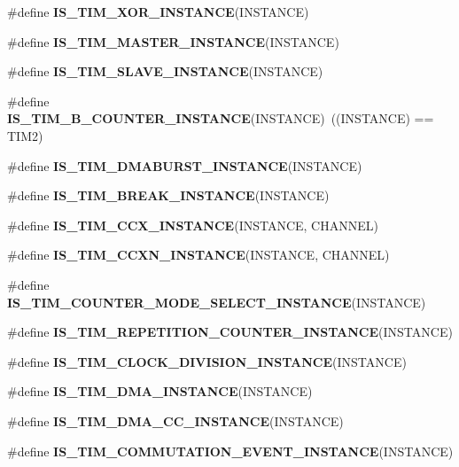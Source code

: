\begin{DoxyCompactItemize}
\item 
\#define {\bfseries I\+S\+\_\+\+T\+I\+M\+\_\+\+X\+O\+R\+\_\+\+I\+N\+S\+T\+A\+N\+CE}(I\+N\+S\+T\+A\+N\+CE)
\item 
\#define {\bfseries I\+S\+\_\+\+T\+I\+M\+\_\+\+M\+A\+S\+T\+E\+R\+\_\+\+I\+N\+S\+T\+A\+N\+CE}(I\+N\+S\+T\+A\+N\+CE)
\item 
\#define {\bfseries I\+S\+\_\+\+T\+I\+M\+\_\+\+S\+L\+A\+V\+E\+\_\+\+I\+N\+S\+T\+A\+N\+CE}(I\+N\+S\+T\+A\+N\+CE)
\item 
\mbox{\label{group___exported__macro_gac41867bf288927ff8ff10a85e67a591b}} 
\#define {\bfseries I\+S\+\_\+\+T\+I\+M\+\_\+B\+\_\+\+C\+O\+U\+N\+T\+E\+R\+\_\+\+I\+N\+S\+T\+A\+N\+CE}(I\+N\+S\+T\+A\+N\+CE)~((I\+N\+S\+T\+A\+N\+CE) == T\+I\+M2)
\item 
\#define {\bfseries I\+S\+\_\+\+T\+I\+M\+\_\+\+D\+M\+A\+B\+U\+R\+S\+T\+\_\+\+I\+N\+S\+T\+A\+N\+CE}(I\+N\+S\+T\+A\+N\+CE)
\item 
\#define {\bfseries I\+S\+\_\+\+T\+I\+M\+\_\+\+B\+R\+E\+A\+K\+\_\+\+I\+N\+S\+T\+A\+N\+CE}(I\+N\+S\+T\+A\+N\+CE)
\item 
\#define {\bfseries I\+S\+\_\+\+T\+I\+M\+\_\+\+C\+C\+X\+\_\+\+I\+N\+S\+T\+A\+N\+CE}(I\+N\+S\+T\+A\+N\+CE,  C\+H\+A\+N\+N\+EL)
\item 
\#define {\bfseries I\+S\+\_\+\+T\+I\+M\+\_\+\+C\+C\+X\+N\+\_\+\+I\+N\+S\+T\+A\+N\+CE}(I\+N\+S\+T\+A\+N\+CE,  C\+H\+A\+N\+N\+EL)
\item 
\#define {\bfseries I\+S\+\_\+\+T\+I\+M\+\_\+\+C\+O\+U\+N\+T\+E\+R\+\_\+\+M\+O\+D\+E\+\_\+\+S\+E\+L\+E\+C\+T\+\_\+\+I\+N\+S\+T\+A\+N\+CE}(I\+N\+S\+T\+A\+N\+CE)
\item 
\#define {\bfseries I\+S\+\_\+\+T\+I\+M\+\_\+\+R\+E\+P\+E\+T\+I\+T\+I\+O\+N\+\_\+\+C\+O\+U\+N\+T\+E\+R\+\_\+\+I\+N\+S\+T\+A\+N\+CE}(I\+N\+S\+T\+A\+N\+CE)
\item 
\#define {\bfseries I\+S\+\_\+\+T\+I\+M\+\_\+\+C\+L\+O\+C\+K\+\_\+\+D\+I\+V\+I\+S\+I\+O\+N\+\_\+\+I\+N\+S\+T\+A\+N\+CE}(I\+N\+S\+T\+A\+N\+CE)
\item 
\#define {\bfseries I\+S\+\_\+\+T\+I\+M\+\_\+\+D\+M\+A\+\_\+\+I\+N\+S\+T\+A\+N\+CE}(I\+N\+S\+T\+A\+N\+CE)
\item 
\#define {\bfseries I\+S\+\_\+\+T\+I\+M\+\_\+\+D\+M\+A\+\_\+\+C\+C\+\_\+\+I\+N\+S\+T\+A\+N\+CE}(I\+N\+S\+T\+A\+N\+CE)
\item 
\#define {\bfseries I\+S\+\_\+\+T\+I\+M\+\_\+\+C\+O\+M\+M\+U\+T\+A\+T\+I\+O\+N\+\_\+\+E\+V\+E\+N\+T\+\_\+\+I\+N\+S\+T\+A\+N\+CE}(I\+N\+S\+T\+A\+N\+CE)

\end{DoxyCompactItemize}
